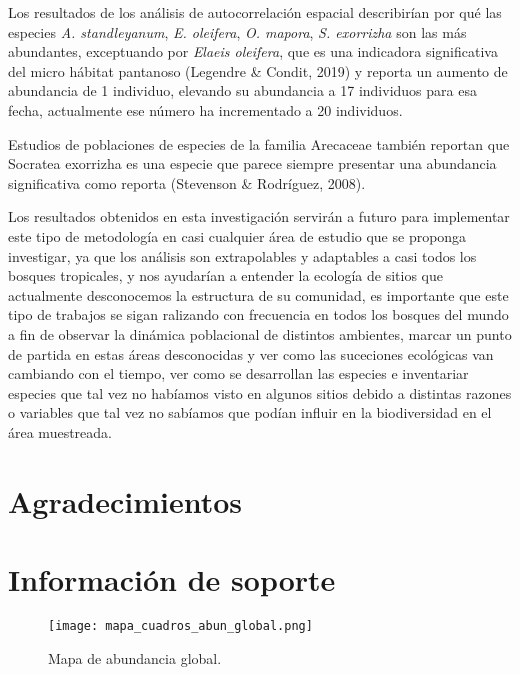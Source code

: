 \documentclass[11pt,]{article}
\newcommand{\beginsupplement}{ \setcounter{table}{0} \renewcommand{\thetable}{S\arabic{table}} \setcounter{figure}{0} \renewcommand{\thefigure}{S\arabic{figure}} }
\begin{document}
Los resultados de los análisis de autocorrelación espacial describirían
por qué las especies \emph{A. standleyanum}, \emph{E. oleifera},
\emph{O. mapora}, \emph{S. exorrizha} son las más abundantes,
exceptuando por \emph{Elaeis oleifera}, que es una indicadora
significativa del micro hábitat pantanoso (Legendre \& Condit, 2019) y
reporta un aumento de abundancia de 1 individuo, elevando su abundancia
a 17 individuos para esa fecha, actualmente ese número ha incrementado a
20 individuos.

Estudios de poblaciones de especies de la familia Arecaceae también
reportan que Socratea exorrizha es una especie que parece siempre
presentar una abundancia significativa como reporta (Stevenson \&
Rodríguez, 2008).

Los resultados obtenidos en esta investigación servirán a futuro para
implementar este tipo de metodología en casi cualquier área de estudio
que se proponga investigar, ya que los análisis son extrapolables y
adaptables a casi todos los bosques tropicales, y nos ayudarían a
entender la ecología de sitios que actualmente desconocemos la
estructura de su comunidad, es importante que este tipo de trabajos se
sigan ralizando con frecuencia en todos los bosques del mundo a fin de
observar la dinámica poblacional de distintos ambientes, marcar un punto
de partida en estas áreas desconocidas y ver como las suceciones
ecológicas van cambiando con el tiempo, ver como se desarrollan las
especies e inventariar especies que tal vez no habíamos visto en algunos
sitios debido a distintas razones o variables que tal vez no sabíamos
que podían influir en la biodiversidad en el área muestreada.

\section{Agradecimientos}\label{agradecimientos}

\section{Información de soporte}\label{informaciuxf3n-de-soporte}

\beginsupplement

\begin{figure}
\centering
\texttt{[image: mapa\_cuadros\_abun\_global.png]}
\caption{Mapa de abundancia global.
\label{fig:mapa_cuadros_abun_global}}
\end{figure}
\end{document}
